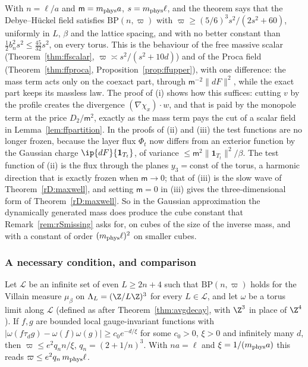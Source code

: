 \begin{remark}\label{rM3:DHremark}
With $n=\ell/a$ and $\mathsf m=m_{\rm phys}a$, $s=m_{\rm phys}\ell$, and the
theorem says that the Debye--H\"uckel field satisfies $\mathrm{BP}(n,
\varpi)$ with $\varpi\ge(5/6)^3s^2/(2s^2+60)$, uniformly in $L$, $\beta$ and
the lattice spacing, and with no better constant than
$\frac12b_n^2s^2\le\frac{45}{32}s^2$, on every torus. This is the behaviour of the free massive
scalar (Theorem~\ref{thm:ffscalar}, $\varpi\asymp s^2/(s^2+10d)$) and of the
Proca field (Theorem~\ref{thm:ffproca}, Proposition~\ref{prop:ffupper}),
with one difference: the mass term acts only on the coexact part, through
$\mathsf m^{-2}\lVert dF\rVert^2$, while the exact part keeps its massless
law. The proof of (i) shows how this suffices: cutting $v$ by the profile
creates the divergence $(\nabla\chi_x)\cdot w$, and that is paid by the
monopole term at the price $D_2/\mathsf m^2$, exactly as the mass term pays
the cut of a scalar field in Lemma~\ref{lem:ffpartition}. In the proofs of
(ii) and (iii) the test functions are no longer frozen, because the layer
flux $\Phi_t$ now differs from an exterior function by the Gaussian charge
$\ip{dF}{\mathbf 1_{T_t}}$, of variance $\le\mathsf m^2\lVert\mathbf
1_{T_t}\rVert^2/\beta$. The test function of (ii) is the flux through the
planes $y_3=\mathrm{const}$ of the torus, a harmonic direction that is
exactly frozen when $\mathsf m\to0$; that of (iii) is the slow wave of
Theorem~\ref{rD:maxwell}, and setting $\mathsf m=0$ in (iii) gives the
three-dimensional form of Theorem~\ref{rD:maxwell}. So in the Gaussian
approximation
the dynamically generated mass does produce the cube constant that
Remark~\ref{rem:rSmissing} asks for, on cubes of the size of the inverse
mass, and with a constant of order $(m_{\rm phys}\ell)^2$ on smaller cubes.
\end{remark}
\subsubsection{A necessary condition, and comparison}\label{rM3:compare}

\begin{proposition}\label{rM3:xi}
Let $\mathcal L$ be an infinite set of even $L\ge2n+4$ such that
$\mathrm{BP}(n,\varpi)$ holds for the Villain measure $\mu_\beta$ on
$\Lambda_L=(\Z/L\Z)^3$ for every $L\in\mathcal L$, and let $\omega$ be a
torus limit along $\mathcal L$ (defined as after
Theorem~\ref{thm:avgdecay}, with $\Z^3$ in place of $\Z^4$). If $f,g$ are bounded local gauge-invariant
functions with $\lvert\omega(f\tau_dg)-\omega(f)\omega(g)\rvert\ge c_0e^{-d/
\xi}$ for some $c_0>0$, $\xi>0$ and infinitely many $d$, then $\varpi\le e^2
q_nn/\xi$, $q_n=(2+1/n)^3$. With $na=\ell$ and $\xi=1/(m_{\rm phys}a)$
this reads $\varpi\le e^2q_n\,m_{\rm phys}\ell$.
\end{proposition}

